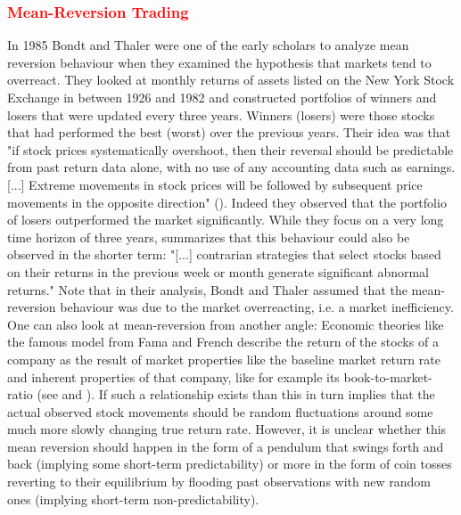 \subsubsection{\textcolor{red}{Mean-Reversion Trading}}
In 1985 Bondt and Thaler \citet{bondt_does_1985} were one of the early scholars to analyze mean reversion behaviour when they examined the hypothesis that markets tend to overreact. They looked at monthly returns of assets listed on the New York Stock Exchange in between 1926 and 1982 and constructed portfolios  of winners and losers that were updated every three years. Winners (losers) were those stocks that had performed the best (worst) over the previous years. Their idea was that "if stock prices systematically overshoot, then their reversal should be predictable from past return data alone, with no use of any accounting data such as earnings. [...] Extreme movements in stock prices will be followed by subsequent price movements in the opposite direction" (\cite{bondt_does_1985}). Indeed they observed that the portfolio of losers outperformed the market significantly. While they focus on a very long time horizon of three years, \citep{jegadeesh_returns_1993} summarizes that this behaviour could also be observed in the shorter term: "[...] contrarian strategies that select stocks based on their returns in the previous week or month generate significant abnormal returns." Note that in their analysis, Bondt and Thaler assumed that the mean-reversion behaviour was due to the market overreacting, i.e. a market inefficiency. One can also look at mean-reversion from another angle: Economic theories like the famous model from Fama and French describe the return of the stocks of a company as the result of market properties like the baseline market return rate and inherent properties of that company, like for example its book-to-market-ratio  (see \citep{fama_cross-section_1992} and \citep{fama_common_1993}). If such a relationship exists than this in turn implies that the actual observed stock movements should be random fluctuations around some much more slowly changing true return rate. However, it is unclear whether this mean reversion should happen in the form of a pendulum that swings forth and back (implying some short-term predictability) or more in the form of coin tosses reverting to their equilibrium by flooding past observations with new random ones (implying short-term non-predictability). 

